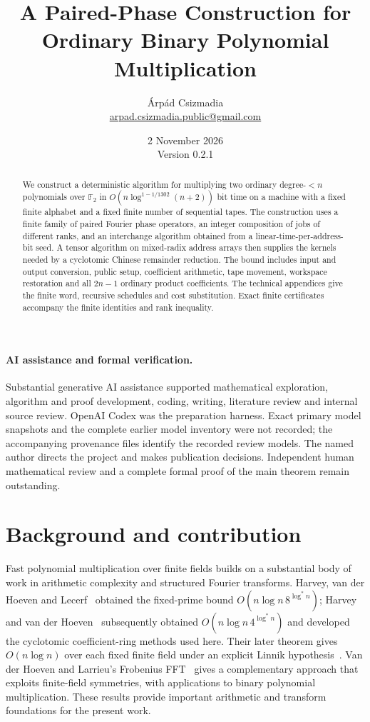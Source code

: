 \documentclass[11pt]{article}
\title{A Paired-Phase Construction for Ordinary Binary Polynomial Multiplication}
\author{\'Arp\'ad Csizmadia\\
\small\href{mailto:arpad.csizmadia.public@gmail.com}{arpad.csizmadia.public@gmail.com}}
\date{2 November 2026\\\small Version 0.2.1}
\newcommand{\F}{\mathbb F}
\newcommand{\Oh}{O}
\begin{document}
\maketitle
\begin{abstract}
We construct a deterministic algorithm for multiplying two ordinary
degree-$<n$ polynomials over $\F_2$ in
$\Oh(n\log^{1-1/1302}(n+2))$ bit time on a machine with a fixed finite
alphabet and a fixed finite number of sequential tapes. The construction
uses a finite family of paired Fourier phase operators, an integer
composition of jobs of different ranks, and an interchange algorithm
obtained from a linear-time-per-address-bit seed. A tensor algorithm on
mixed-radix address arrays then supplies the kernels needed by a
cyclotomic Chinese remainder reduction. The bound includes input and
output conversion, public setup, coefficient arithmetic, tape movement,
workspace restoration and all $2n-1$ ordinary product coefficients.
The technical appendices give the finite word, recursive schedules and
cost substitution. Exact finite certificates accompany the finite
identities and rank inequality.
\end{abstract}

\paragraph{AI assistance and formal verification.}
Substantial generative AI assistance supported mathematical exploration,
algorithm and proof development, coding, writing, literature review and
internal source review. OpenAI Codex was the preparation harness. Exact
primary model snapshots and the complete earlier model inventory were
not recorded; the accompanying provenance files identify the recorded
review models. The named author directs the project and makes publication
decisions. Independent human mathematical review and a complete formal
proof of the main theorem remain outstanding.

\clearpage
\tableofcontents
\clearpage

\section*{Background and contribution}
Fast polynomial multiplication over finite fields builds on a substantial
body of work in arithmetic complexity and structured Fourier transforms.
Harvey, van der Hoeven and Lecerf~\cite{hvhl} obtained the fixed-prime
bound $\Oh(n\log n\,8^{\log^*n})$; Harvey and van der Hoeven~\cite{host}
subsequently obtained $\Oh(n\log n\,4^{\log^*n})$ and developed the
cyclotomic coefficient-ring methods used here. Their later theorem gives
$\Oh(n\log n)$ over each fixed finite field under an explicit Linnik
hypothesis~\cite[Theorem 1.2]{ffnlogn}. Van der Hoeven and Larrieu's Frobenius
FFT~\cite{frobenius} gives a complementary approach that exploits
finite-field symmetries, with applications to binary polynomial
multiplication. These results provide important arithmetic and transform
foundations for the present work.
\end{document}
